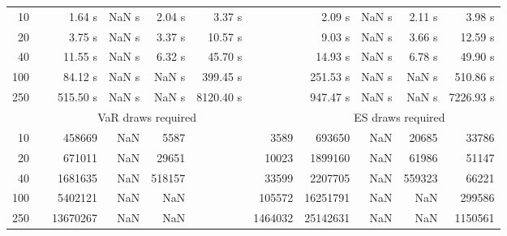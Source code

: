 {\begin{table}[h]
\begin{tabular}{rr rrrr r rrrr}
10 & & 1.64 s &  NaN s & 2.04 s & 3.37 s && 2.09 s &  NaN s & 2.11 s & 3.98 s \\ 
20 & & 3.75 s &  NaN s & 3.37 s & 10.57 s && 9.03 s &  NaN s & 3.66 s & 12.59 s \\ 
40 & & 11.55 s &  NaN s & 6.32 s & 45.70 s && 14.93 s &  NaN s & 6.78 s & 49.90 s \\ 
100 & & 84.12 s &  NaN s &  NaN s & 399.45 s && 251.53 s &  NaN s &  NaN s & 510.86 s \\ 
250 & & 515.50 s &  NaN s &  NaN s & 8120.40 s && 947.47 s &  NaN s &  NaN s & 7226.93 s \\ 
\hline 
 && \multicolumn{4 }{c}{VaR draws required} &&   \multicolumn{4}{c}{ES draws required} \\  \cline{3-6}  \cline{8-11} 
10 & & 458669 & NaN & 5587 & & 3589 & 693650 & NaN & 20685  & 33786 \\ 
20 & & 671011 & NaN & 29651 & & 10023 & 1899160 & NaN & 61986  & 51147 \\ 
40 & & 1681635 & NaN & 518157 & & 33599 & 2207705 & NaN & 559323  & 66221 \\ 
100 & & 5402121 & NaN & NaN & & 105572 & 16251791 & NaN & NaN  & 299586 \\ 
250 & & 13670267 & NaN & NaN & & 1464032 & 25142631 & NaN & NaN  & 1150561 \\ 
\hline 
\end{tabular} 
\end{table} 
} 
